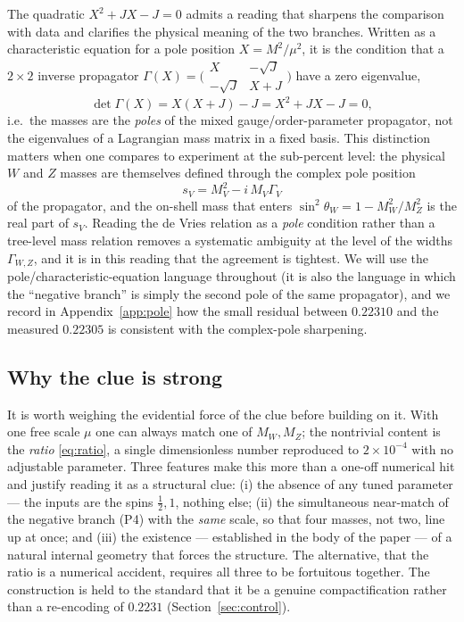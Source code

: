 \documentclass[11pt]{article}
\theoremstyle{plain}
\theoremstyle{definition}
\newcommand{\half}{\tfrac12}
\newcommand{\sinsq}{\sin^{2}\theta_W}
\begin{document}
The quadratic $X^2+JX-J=0$ admits a reading that sharpens the comparison
with data and clarifies the physical meaning of the two branches. Written
as a characteristic equation for a pole position $X=M^2/\mu^2$, it is the condition
that a $2\times2$ inverse propagator
$\Gamma(X)=\bigl(\begin{smallmatrix}X&-\sqrt J\\-\sqrt J&X+J\end{smallmatrix}\bigr)$
have a zero eigenvalue,
\begin{equation}
\det\Gamma(X)=X(X+J)-J=X^2+JX-J=0,
\end{equation}
i.e.\ the masses are the \emph{poles} of the mixed gauge/order-parameter
propagator, not the eigenvalues of a Lagrangian mass matrix in a fixed
basis. This distinction matters when one compares to experiment at the
sub-percent level: the physical $W$ and $Z$ masses are themselves defined
through the complex pole position
\begin{equation}
s_V=M_V^2-i\,M_V\Gamma_V
\end{equation}
of the propagator, and the on-shell mass that enters
$\sinsq=1-M_W^2/M_Z^2$ is the real part of $s_V$. Reading the de Vries
relation as a \emph{pole} condition rather than a tree-level mass relation
removes a systematic ambiguity at the level of the widths $\Gamma_{W,Z}$,
and it is in this reading that the agreement is tightest. We will use the
pole/characteristic-equation language throughout (it is also the language in which the
``negative branch'' is simply the second pole of the same propagator), and
we record in Appendix~\ref{app:pole} how the small residual between
$0.22310$ and the measured $0.22305$ is consistent with the
complex-pole sharpening.

\subsection{Why the clue is strong}

It is worth weighing the evidential force of the clue before building on it.
With one free scale $\mu$ one can always match one of $M_W,M_Z$; the
nontrivial content is the \emph{ratio} \eqref{eq:ratio}, a single
dimensionless number reproduced to $2\times10^{-4}$ with no adjustable
parameter. Three features make this more than a one-off numerical hit and
justify reading it as a structural clue: (i) the absence of any tuned
parameter --- the inputs are the spins $\half,1$, nothing else; (ii) the
simultaneous near-match of the negative branch (P4) with the \emph{same}
scale, so that four masses, not two, line up at once; and (iii) the
existence --- established in the body of the paper --- of a natural internal
geometry that forces the structure. The alternative, that the ratio is a
numerical accident, requires all three to be fortuitous together. The
construction is held to the standard that it be a genuine compactification
rather than a re-encoding of $0.2231$ (Section~\ref{sec:control}).
\end{document}
